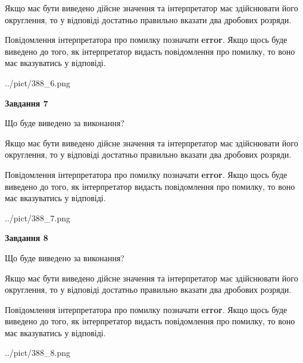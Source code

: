 \documentclass[12pt, ukrainian]{article}
\begin{document}
{\begin {Large}
Якщо має бути виведено дійсне значення та інтерпретатор має здійснювати його округлення, 
то у відповіді достатньо правильно вказати два дробових розряди.

Повідомлення інтерпретатора про помилку позначати \textbf{error}.
Якщо щось буде виведено до того, як інтерпретатор видасть повідомлення про помилку, 
то воно має вказуватись у відповіді. \par

\begin{center}
	{../pict/388_6.png}
\end{center}
\newpage

{\begin {center}\textbf{Завдання 7}\end {center}}\par
Що буде виведено за виконання? \par

Якщо має бути виведено дійсне значення та інтерпретатор має здійснювати його округлення, 
то у відповіді достатньо правильно вказати два дробових розряди.

Повідомлення інтерпретатора про помилку позначати \textbf{error}.
Якщо щось буде виведено до того, як інтерпретатор видасть повідомлення про помилку, 
то воно має вказуватись у відповіді. \par

\begin{center}
	{../pict/388_7.png}
\end{center}
\newpage

{\begin {center}\textbf{Завдання 8}\end {center}}\par
Що буде виведено за виконання? \par

Якщо має бути виведено дійсне значення та інтерпретатор має здійснювати його округлення, 
то у відповіді достатньо правильно вказати два дробових розряди.

Повідомлення інтерпретатора про помилку позначати \textbf{error}.
Якщо щось буде виведено до того, як інтерпретатор видасть повідомлення про помилку, 
то воно має вказуватись у відповіді. \par

\begin{center}
	{../pict/388_8.png}
\end{center}
\newpage


\end{Large}}
\end{document}
